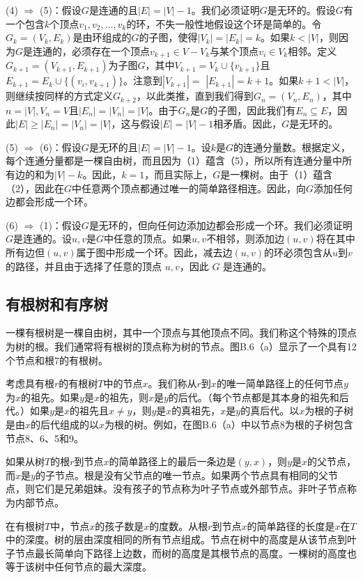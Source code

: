 \documentclass[lang=cn,newtx,10pt,scheme=chinese]{elegantbook}
\begin{document}
(4) $\Rightarrow$ (5)：假设$G$是连通的且$|E|=|V|-1$。我们必须证明$G$是无环的。假设$G$有一个包含$k$个顶点$v_1, v_2, \ldots, v_k$的环，不失一般性地假设这个环是简单的。令$G_k=(V_k, E_k)$是由环组成的$G$的子图，使得$|V_k|=|E_k|=k$。如果$k<|V|$，则因为$G$是连通的，必须存在一个顶点$v_{k+1} \in V-V_k$与某个顶点$v_i \in V_k$相邻。定义$G_{k+1}=(V_{k+1}, E_{k+1})$为子图$G$，其中$V_{k+1}=V_k \cup\{v_{k+1}\}$且$E_{k+1}=E_k \cup\{(v_i, v_{k+1})\}$。注意到$|V_{k+1}|=$ $|E_{k+1}|=k+1$。如果$k+1<|V|$，则继续按同样的方式定义$G_{k+2}$，以此类推，直到我们得到$G_n=(V_n, E_n)$，其中$n=|V|, V_n=V$且$|E_n|=|V_n|=|V|$。由于$G_n$是$G$的子图，因此我们有$E_n \subseteq E$，因此$|E| \geq|E_n|=|V_n|=|V|$，这与假设$|E|=|V|-1$相矛盾。因此，$G$是无环的。

(5) $\Rightarrow$ (6)：假设$G$是无环的且$|E|=|V|-1$。设$k$是$G$的连通分量数。根据定义，每个连通分量都是一棵自由树，而且因为（1）蕴含（5），所以所有连通分量中所有边的和为$|V|-k$。因此，$k=1$，而且实际上，$G$是一棵树。由于（1）蕴含（2），因此在$G$中任意两个顶点都通过唯一的简单路径相连。因此，向$G$添加任何边都会形成一个环。

(6) $\Rightarrow$ (1)：假设$G$是无环的，但向任何边添加边都会形成一个环。我们必须证明$G$是连通的。设$u,v$是$G$中任意的顶点。如果$u,v$不相邻，则添加边$(u,v)$将在其中所有边但$(u,v)$属于图中形成一个环。因此，减去边$(u,v)$的环必须包含从$u$到$v$的路径，并且由于选择了任意的顶点 $u,v $，因此 $G $ 是连通的。


\subsection{有根树和有序树}

一棵有根树是一棵自由树，其中一个顶点与其他顶点不同。我们称这个特殊的顶点为树的根。我们通常将有根树的顶点称为树的节点。图B.6（a）显示了一个具有12个节点和根7的有根树。

考虑具有根$r$的有根树$T$中的节点$x$。我们称从$r$到$x$的唯一简单路径上的任何节点$y$为$x$的祖先。如果$y$是$x$的祖先，则$x$是$y$的后代。（每个节点都是其本身的祖先和后代。）如果$y$是$x$的祖先且$x \neq y$，则$y$是$x$的真祖先，$x$是$y$的真后代。以$x$为根的子树是由$x$的后代组成的以$x$为根的树。例如，在图B.6（a）中以节点8为根的子树包含节点8、6、5和9。

如果从树$T$的根$r$到节点$x$的简单路径上的最后一条边是$(y,x)$，则$y$是$x$的父节点，而$x$是$y$的子节点。根是没有父节点的唯一节点。如果两个节点具有相同的父节点，则它们是兄弟姐妹。没有孩子的节点称为叶子节点或外部节点。非叶子节点称为内部节点。

在有根树$T$中，节点$x$的孩子数是$x$的度数。从根$r$到节点$x$的简单路径的长度是$x$在$T$中的深度。树的层由深度相同的所有节点组成。节点在树中的高度是从该节点到叶子节点最长简单向下路径上边数，而树的高度是其根节点的高度。一棵树的高度也等于该树中任何节点的最大深度。
\end{document}
